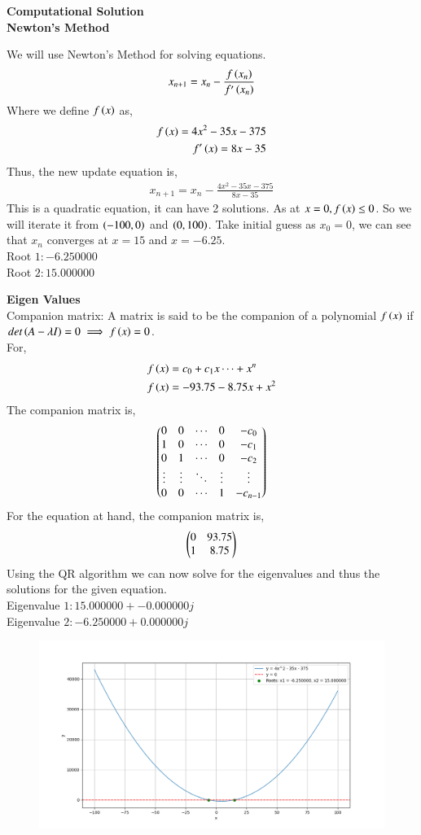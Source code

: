\documentclass[journal]{IEEEtran}
\begin{document}
\textbf{Computational Solution}\\
\textbf{Newton's Method}

We will use Newton's Method for solving equations.
\begin{align}
	x_{n+1} = x_n - \frac{f\left(x_n\right)}{f^{\prime}\left(x_n\right)} 
\end{align}
Where we define $f\left(x\right)$ as, 
\begin{align}
	f\left(x\right) = 4x^2 - 35x - 375 \\
	f^{\prime}\left(x\right) = 8x -35 
\end{align}
Thus, the new update equation is, 
\begin{align}
	x_{n+1} = x_n - \frac{4x^2 - 35x - 375}{8x -35} 
\end{align}
This is a quadratic equation, it can have 2 solutions. As at $x=0,f\left(x\right) \leq 0$. So we will iterate it from $ \left(-100,0\right) $ and $\left(0,100\right)$. Take initial guess as $x_0 = 0$, we can see that $x_n$ converges at $x=15$ and $x=-6.25$.\\
Root $1: -6.250000$\\
Root $2: 15.000000$


\textbf{Eigen Values}\\
Companion matrix: A matrix is said to be the companion of a polynomial $f\left(x\right)$ if 
$det\left(A - \lambda I\right) = 0 \implies f\left(x\right) = 0$. 
\\
For,
\begin{align}
  f\left(x\right) &= c_0 + c_1 x \cdots + x^n\\
  f\left(x\right) &=-93.75-8.75x+x^2
\end{align}
The companion matrix is,
\begin{align}
  \begin{pmatrix}
    0 & 0 & \cdots & 0 & -c_0\\
    1 & 0 & \cdots & 0 & -c_1\\
    0 & 1 & \cdots & 0 & -c_2\\
    \vdots & \vdots & \ddots & \vdots & \vdots\\
    0 & 0 & \cdots & 1 & -c_{n-1}\\
  \end{pmatrix}
\end{align}
For the equation at hand, the companion matrix is,
\begin{align}
  \begin{pmatrix}
    0 & 93.75\\
    1 & 8.75
  \end{pmatrix}
\end{align}
Using the QR algorithm we can now solve for the eigenvalues and thus the solutions for the given equation.\\
Eigenvalue $1: 15.000000 + -0.000000j$\\
Eigenvalue $2: -6.250000 + 0.000000j$


\begin{figure}[h]
    \centering
    \includegraphics[width=\columnwidth]{figs/Figure_1.png}
    \label{fig:Plot}
    \end{figure}
\end{document}
